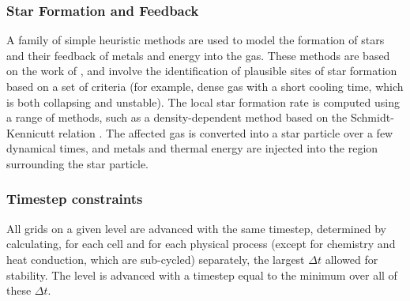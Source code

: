 \subsubsection{Star Formation and Feedback}

A family of simple heuristic methods are used to model the formation
of stars and their feedback of metals and energy into the gas.  These
methods are based on the work of \citet{CO1992}, and involve the
identification of plausible sites of star formation based on a set of
criteria (for example, dense gas with a short cooling time, which is
both collapsing and unstable).  The local star formation rate is
computed using a range of methods, such as a density-dependent method
based on the Schmidt-Kennicutt relation \citep{K89}.  The affected gas
is converted into a star particle over a few dynamical times, and
metals and thermal energy are injected into the region surrounding the
star particle.

\subsubsection{Timestep constraints}

All grids on a given level are advanced with the same timestep,
determined by calculating, for each cell and for each physical process
(except for chemistry and heat conduction, which are sub-cycled)
separately, the largest $\Delta t$ allowed for stability. The level is
advanced with a timestep equal to the minimum over all of these
$\Delta t$.

